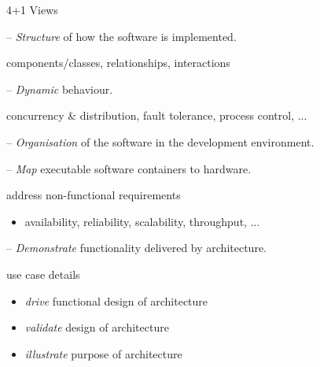 \documentclass{slide}
\begin{document}
\begin{frame}{4+1 Views}

\Large{
\begin{description}
    \item[Logical] -- \textit{Structure} of how the software is implemented.
    \begin{itemize}
        \large{\item[$\bullet$] components/classes, relationships, interactions}
    \end{itemize}
    \item[Process] -- \textit{Dynamic} behaviour.
    \begin{itemize}
        \large{\item[$\bullet$] concurrency \& distribution, fault tolerance, process control, ...}
    \end{itemize}
    \item[Development] -- \textit{Organisation} of the software in the development environment.
    \item[Physical] -- \textit{Map} executable software containers to hardware.
    \begin{itemize}
        \large{\item[$\bullet$] address non-functional requirements}
        \begin{itemize}
            \item[$\bullet$] availability, reliability, scalability, throughput, ...
        \end{itemize}
    \end{itemize}
    \item[Scenario] -- \textit{Demonstrate} functionality delivered by architecture.
    \begin{itemize}
        \large{\item[$\bullet$] use case details}
        \begin{itemize}
            \item[$\bullet$] \textit{drive} functional design of architecture
            \item[$\bullet$] \textit{validate} design of architecture
            \item[$\bullet$] \textit{illustrate} purpose of architecture
        \end{itemize}
    \end{itemize}
\end{description}
}

\end{frame}
\end{document}
